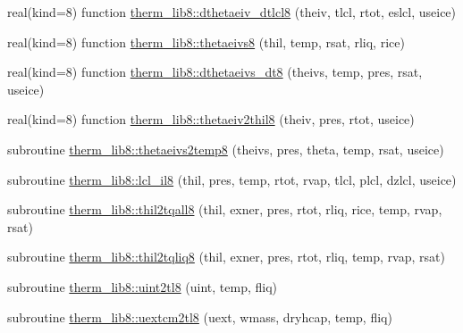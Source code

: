 \begin{DoxyCompactItemize}
\item 
real(kind=8) function \hyperlink{namespacetherm__lib8_ac2831ca558c25b3522c21e3cab5ce230}{therm\+\_\+lib8\+::dthetaeiv\+\_\+dtlcl8} (theiv, tlcl, rtot, eslcl, useice)
\item 
real(kind=8) function \hyperlink{namespacetherm__lib8_a43786e4d4bcf61f6d8fb66fa5a925df9}{therm\+\_\+lib8\+::thetaeivs8} (thil, temp, rsat, rliq, rice)
\item 
real(kind=8) function \hyperlink{namespacetherm__lib8_a6f2144435a34b9e51e60dcab30877216}{therm\+\_\+lib8\+::dthetaeivs\+\_\+dt8} (theivs, temp, pres, rsat, useice)
\item 
real(kind=8) function \hyperlink{namespacetherm__lib8_aeb2f84da15d0d99455778580d72dbde5}{therm\+\_\+lib8\+::thetaeiv2thil8} (theiv, pres, rtot, useice)
\item 
subroutine \hyperlink{namespacetherm__lib8_a3a5271057d229a35bd188bd8cff5571b}{therm\+\_\+lib8\+::thetaeivs2temp8} (theivs, pres, theta, temp, rsat, useice)
\item 
subroutine \hyperlink{namespacetherm__lib8_a0f6906696662a832ed73b03f8f97e449}{therm\+\_\+lib8\+::lcl\+\_\+il8} (thil, pres, temp, rtot, rvap, tlcl, plcl, dzlcl, useice)
\item 
subroutine \hyperlink{namespacetherm__lib8_ac25af6f3203cd6cbf1e3933ae25eaeca}{therm\+\_\+lib8\+::thil2tqall8} (thil, exner, pres, rtot, rliq, rice, temp, rvap, rsat)
\item 
subroutine \hyperlink{namespacetherm__lib8_aec7ba278ae89d43e89ab00a29a825416}{therm\+\_\+lib8\+::thil2tqliq8} (thil, exner, pres, rtot, rliq, temp, rvap, rsat)
\item 
subroutine \hyperlink{namespacetherm__lib8_a25d3d7f68a7ddbdf3c13eac03b1bb780}{therm\+\_\+lib8\+::uint2tl8} (uint, temp, fliq)
\item 
subroutine \hyperlink{namespacetherm__lib8_af00b031b94385eb06e81a837246715bd}{therm\+\_\+lib8\+::uextcm2tl8} (uext, wmass, dryhcap, temp, fliq)
\end{DoxyCompactItemize}
